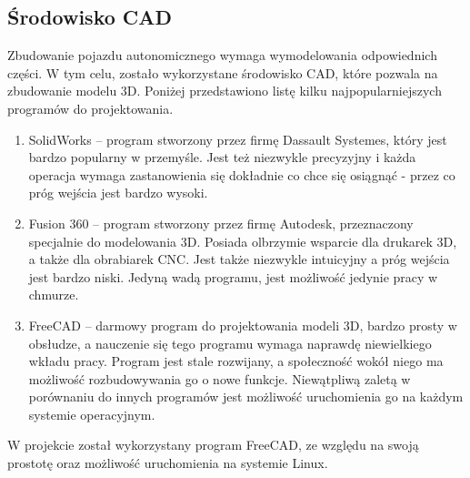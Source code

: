     \subsection{Środowisko CAD}
        Zbudowanie pojazdu autonomicznego wymaga wymodelowania odpowiednich części.
        W tym celu, zostało wykorzystane środowisko CAD, które pozwala na zbudowanie modelu 3D.
        Poniżej przedstawiono listę kilku najpopularniejszych programów do projektowania.
        \begin{enumerate}
            \item SolidWorks -- program stworzony przez firmę Dassault Systemes, który jest bardzo popularny w przemyśle. Jest też niezwykle precyzyjny i każda operacja wymaga zastanowienia się dokładnie co chce się osiągnąć - przez co próg wejścia jest bardzo wysoki.
            \item Fusion 360 -- program stworzony przez firmę Autodesk, przeznaczony specjalnie do modelowania 3D. Posiada olbrzymie wsparcie dla drukarek 3D, a także dla obrabiarek CNC.
                                Jest także niezwykle intuicyjny a próg wejścia jest bardzo niski. Jedyną wadą programu, jest możliwość jedynie pracy w chmurze.
            \item FreeCAD -- darmowy program do projektowania modeli 3D, bardzo prosty w obsłudze, a nauczenie się tego programu wymaga naprawdę niewielkiego wkładu pracy.
                             Program jest stale rozwijany, a społeczność wokół niego ma możliwość rozbudowywania go o nowe funkcje. Niewątpliwą zaletą w porównaniu do innych programów jest możliwość uruchomienia go na każdym systemie operacyjnym.
        \end{enumerate}

        W projekcie został wykorzystany program FreeCAD, ze względu na swoją prostotę oraz możliwość uruchomienia na systemie Linux.


